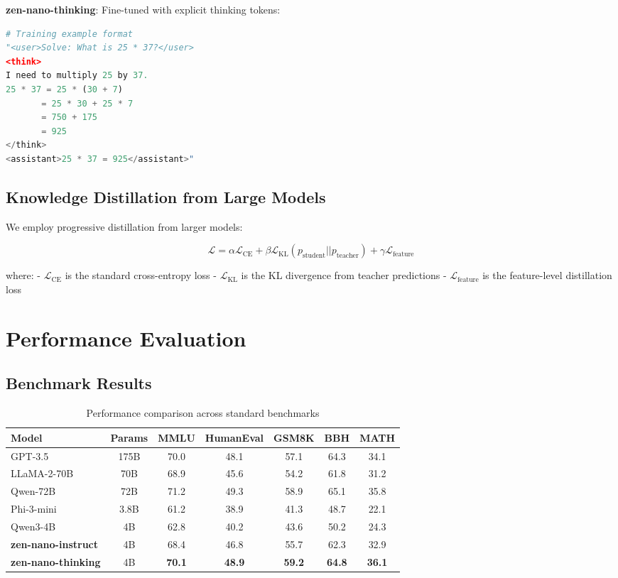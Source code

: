\documentclass[11pt,a4paper]{article}
\begin{document}
\textbf{zen-nano-thinking}: Fine-tuned with explicit thinking tokens:
\begin{lstlisting}[language=Python]
# Training example format
"<user>Solve: What is 25 * 37?</user>
<think>
I need to multiply 25 by 37.
25 * 37 = 25 * (30 + 7)
       = 25 * 30 + 25 * 7
       = 750 + 175
       = 925
</think>
<assistant>25 * 37 = 925</assistant>"
\end{lstlisting}

\subsection{Knowledge Distillation from Large Models}

We employ progressive distillation from larger models:

\begin{equation}
\mathcal{L} = \alpha \mathcal{L}_{\text{CE}} + \beta \mathcal{L}_{\text{KL}}(p_{\text{student}} || p_{\text{teacher}}) + \gamma \mathcal{L}_{\text{feature}}
\end{equation}

where:
- $\mathcal{L}_{\text{CE}}$ is the standard cross-entropy loss
- $\mathcal{L}_{\text{KL}}$ is the KL divergence from teacher predictions
- $\mathcal{L}_{\text{feature}}$ is the feature-level distillation loss

\section{Performance Evaluation}

\subsection{Benchmark Results}

\begin{table}[h]
\centering
\caption{Performance comparison across standard benchmarks}
\begin{tabular}{lcccccc}
\toprule
Model & Params & MMLU & HumanEval & GSM8K & BBH & MATH \\
\midrule
GPT-3.5 & 175B & 70.0 & 48.1 & 57.1 & 64.3 & 34.1 \\
LLaMA-2-70B & 70B & 68.9 & 45.6 & 54.2 & 61.8 & 31.2 \\
Qwen-72B & 72B & 71.2 & 49.3 & 58.9 & 65.1 & 35.8 \\
\midrule
Phi-3-mini & 3.8B & 61.2 & 38.9 & 41.3 & 48.7 & 22.1 \\
Qwen3-4B & 4B & 62.8 & 40.2 & 43.6 & 50.2 & 24.3 \\
\midrule
\textbf{zen-nano-instruct} & 4B & 68.4 & 46.8 & 55.7 & 62.3 & 32.9 \\
\textbf{zen-nano-thinking} & 4B & \textbf{70.1} & \textbf{48.9} & \textbf{59.2} & \textbf{64.8} & \textbf{36.1} \\
\bottomrule
\end{tabular}
\end{table}
\end{document}
